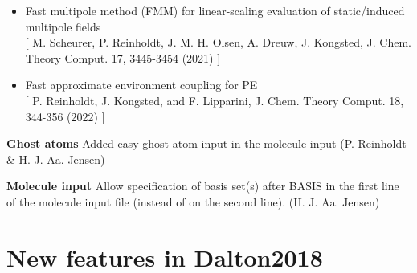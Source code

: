 \begin{description}
\begin{itemize}
    [ A. M. Khah, P. Reinholdt, J. M. H. Olsen, J. Kongsted and C. Hattig, J. Chem. Theory. Comput. 16, 1373-1381 (2020) ].
  \item Fast multipole method (FMM) for linear-scaling evaluation of static/induced multipole fields \\ {}
    [ M. Scheurer, P. Reinholdt, J. M. H. Olsen, A. Dreuw, J. Kongsted, J. Chem. Theory Comput. 17, 3445-3454 (2021) ]
  \item Fast approximate environment coupling for PE \\ {}
    [ P. Reinholdt, J. Kongsted, and F. Lipparini, J. Chem. Theory Comput. 18, 344-356 (2022) ]
 \end{itemize}
\item {\bf Ghost atoms} Added easy ghost atom input in the molecule input (P. Reinholdt \& H. J. Aa. Jensen)
\item {\bf Molecule input} Allow specification of basis set(s) after BASIS in the first line of the molecule input file (instead of on the second line). (H. J. Aa. Jensen)
\end{description}

\section{New features in Dalton2018}

